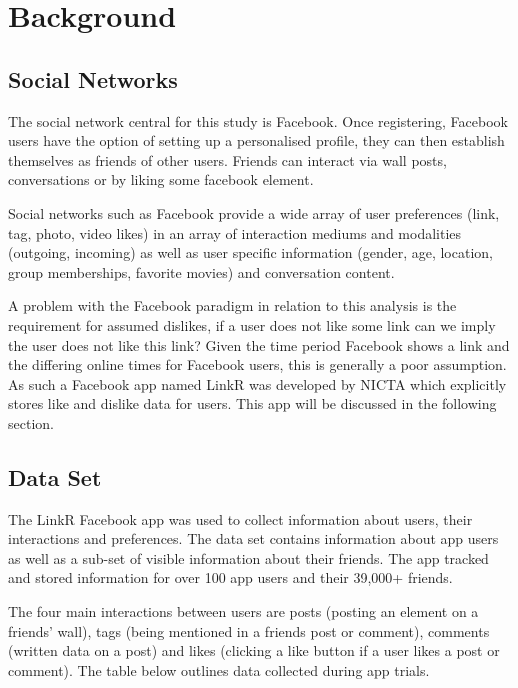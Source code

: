 
\chapter{Background}
\label{cha:back}

\section{Social Networks}
\label{sec:sn}

The social network central for this study is Facebook. Once registering, Facebook users have the option of setting up a personalised profile, they can then establish
 themselves as friends of other users. Friends can interact via wall posts, conversations or by liking some facebook element.

Social networks such as Facebook provide a wide array of user preferences (link, tag, photo, video likes) in an array of interaction mediums and modalities 
(outgoing, incoming) as well as user specific information (gender, age, location, group memberships, favorite movies) and conversation content.

A problem with the Facebook paradigm in relation to this analysis is the requirement for assumed dislikes, if a user does not like some link can we 
imply the user does not like this link? Given the time period Facebook shows a link and the differing online times for Facebook users, this is generally 
a poor assumption. As such a Facebook app named LinkR was developed by NICTA which explicitly stores like and dislike data for users. This app will 
be discussed in the following section.

\section{Data Set}
\label{sec:data}

The LinkR Facebook app was used to collect information about users, their interactions and preferences. The data set contains information about app users as 
well as a sub-set of visible information about their friends. The app tracked and stored information for over 100 app users and their 39,000+ friends.

The four main interactions between users are posts (posting an element on a friends' wall), tags (being mentioned in a friends post or comment), 
 comments (written data on a post) and likes (clicking a like button if a user likes a post or comment). The table below outlines data collected during 
 app trials.

